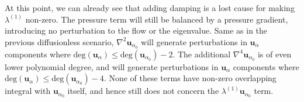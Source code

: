 %
At this point, we can already see that adding damping is a lost cause for making $\lambda^{(1)}$ non-zero. The pressure term will still be balanced by a pressure gradient, introducing no perturbation to the flow or the eigenvalue. Same as in the previous diffusionless scenario, $\nabla^2 \mathbf{u}_{\alpha_0}$ will generate perturbations in $\mathbf{u}_\alpha$ components where $\mathrm{deg}(\mathbf{u}_\alpha) \leq \mathrm{deg}(\mathbf{u}_{\alpha_0}) - 2$. The additional $\nabla^4 \mathbf{u}_{\alpha_0}$ is of even lower polynomial degree, and will generate perturbations in $\mathbf{u}_\alpha$ components where $\mathrm{deg}(\mathbf{u}_\alpha) \leq \mathrm{deg}(\mathbf{u}_{\alpha_0}) - 4$. None of these terms have non-zero overlapping integral with $\mathbf{u}_{\alpha_0}$ itself, and hence still does not concern the $\lambda^{(1)} \mathbf{u}_{\alpha_0}$ term.

